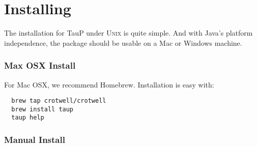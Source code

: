 
\section{Installing}
\label{install}

The installation for TauP under \textsc{Unix} is quite simple. And with Java's
platform independence, the package should be usable on a Mac or Windows
machine.

\subsubsection{Max OSX Install}

For Mac OSX, we recommend Homebrew. Installation is easy with:

\begin{verbatim}
  brew tap crotwell/crotwell
  brew install taup
  taup help
\end{verbatim}

\subsubsection{Manual Install}

